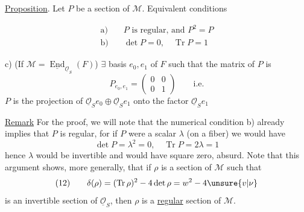 
\uline{Proposition}. Let $P$ be a section of $\mathcal M$. Equivalent conditions

\[
\begin{aligned}
\text{a)}\quad &P\text{ is regular, and }P^2=P\\
\text{b)}\quad &\det P=0,\quad\operatorname{Tr}P=1
\end{aligned}
\]

c) (If $\mathcal M=\underline{\operatorname{End}}_{\underline{\mathcal O}_S}(F)$) $\exists$ basis $e_0,e_1$ of $F$ such that the matrix of $P$ is
\[
P_{e_0,e_1}=\begin{pmatrix}0&0\\0&1\end{pmatrix}\qquad\text{i.e.}
\]
$P$ is the projection of $\underline{\mathcal O}_S e_0\oplus\underline{\mathcal O}_S e_1$ onto the factor $\underline{\mathcal O}_S e_1$


\uline{Remark}  For the proof, we will note that the numerical condition b) already implies that $P$ is regular, for if $P$ were a scalar $\lambda$ (on a fiber) we would have
\[
\det P=\lambda^2=0,\quad\operatorname{Tr}P=2\lambda=1
\]
hence $\lambda$ would be invertible and would have square zero, absurd. Note that this argument shows, more generally, that if $\rho$ is a section of $\mathcal M$ such that
\[
(12)\qquad \delta(\rho)=(\operatorname{Tr}\rho)^2-4\det\rho=w^2-4\unsure{v|\nu}
\]
is an invertible section of $\underline{\mathcal O}_S$, then $\rho$ is a \uline{regular} section of $\mathcal M$.


